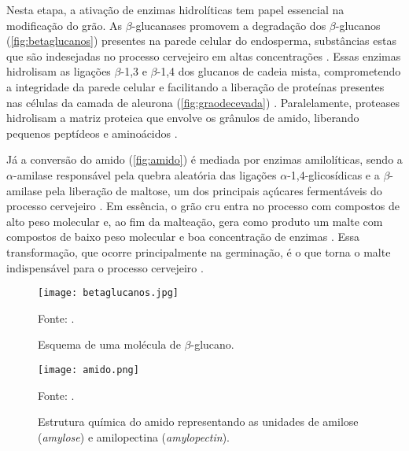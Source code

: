 Nesta etapa, a ativação de enzimas hidrolíticas tem papel essencial na modificação do grão. As $\beta$-glucanases promovem a degradação dos $\beta$-glucanos (\autoref{fig:betaglucanos}) presentes na parede celular do endosperma, substâncias estas que são indesejadas no processo cervejeiro em altas concentrações \cite{LEWIS2012}. Essas enzimas hidrolisam as ligações $\beta$-1,3 e $\beta$-1,4 dos glucanos de cadeia mista, comprometendo a integridade da parede celular e facilitando a liberação de proteínas presentes nas células da camada de aleurona (\autoref{fig:graodecevada}) \cite{bobade2022betaglucans}. Paralelamente, proteases hidrolisam a matriz proteica que envolve os grânulos de amido, liberando pequenos peptídeos e aminoácidos \cite{FOX2009,GUPTA2010}. 

Já a conversão do amido (\autoref{fig:amido}) é mediada por enzimas amilolíticas, sendo a $\alpha$-amilase responsável pela quebra aleatória das ligações $\alpha$-1,4-glicosídicas e a $\beta$-amilase pela liberação de maltose, um dos principais açúcares fermentáveis do processo cervejeiro \cite{GUPTA2010,MALLETT2022}. Em essência, o grão cru entra no processo com compostos de alto peso molecular e, ao fim da malteação, gera como produto um malte com compostos de baixo peso molecular e boa concentração de enzimas \cite{KUNZE1996}. Essa transformação, que ocorre principalmente na germinação, é o que torna o malte indispensável para o processo cervejeiro \cite{CENCI2021}.

\begin{figure}[ht]
    \centering
    \caption{Esquema de uma molécula de $\beta$-glucano.}
    \label{fig:betaglucanos}
    \texttt{[image: betaglucanos.jpg]}

    {\centering\footnotesize Fonte: .\par}
\end{figure}

\begin{figure}[ht]
    \centering
    \caption{Estrutura química do amido representando as unidades de amilose (\textit{amylose}) e amilopectina (\textit{amylopectin}).}
    \label{fig:amido}
    \texttt{[image: amido.png]}

    {\centering\footnotesize Fonte: .\par}
\end{figure}

